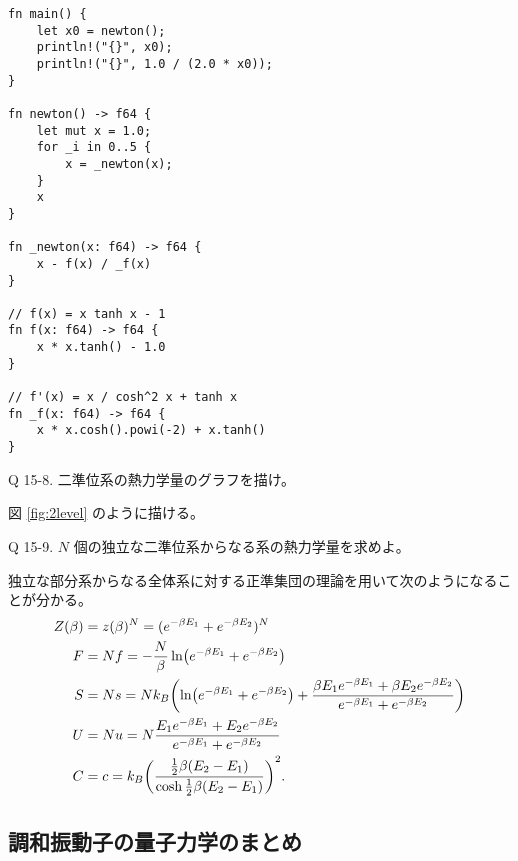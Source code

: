 \documentclass[uplatex,dvipdfmx,a4paper,11pt]{jlreq}
\theoremstyle{definition}
\begin{document}
\begin{lstlisting}[caption=Newton 法による,label=newton]
fn main() {
    let x0 = newton();
    println!("{}", x0);
    println!("{}", 1.0 / (2.0 * x0));
}

fn newton() -> f64 {
    let mut x = 1.0;
    for _i in 0..5 {
        x = _newton(x);
    }
    x
}

fn _newton(x: f64) -> f64 {
    x - f(x) / _f(x)
}

// f(x) = x tanh x - 1
fn f(x: f64) -> f64 {
    x * x.tanh() - 1.0
}

// f'(x) = x / cosh^2 x + tanh x
fn _f(x: f64) -> f64 {
    x * x.cosh().powi(-2) + x.tanh()
}
\end{lstlisting}

\begin{itembox}[l]{Q 15-8.}
  二準位系の熱力学量のグラフを描け。
\end{itembox}

図 \ref{fig:2level} のように描ける。



\begin{itembox}[l]{Q 15-9.}
  $N$ 個の独立な二準位系からなる系の熱力学量を求めよ。
\end{itembox}

独立な部分系からなる全体系に対する正準集団の理論を用いて次のようになることが分かる。
\begin{align}
  Z(\beta) & = z(\beta)^N = (e^{-\beta E_1} + e^{-\beta E_2})^N                                                                                                \\
  F        & = Nf = -\frac{N}{\beta}\ln(e^{-\beta E_1} + e^{-\beta E_2})                                                                                       \\
  S        & = Ns = Nk_B\qty(\ln(e^{-\beta E_1} + e^{-\beta E_2}) + \frac{\beta E_1e^{-\beta E_1} + \beta E_2e^{-\beta E_2}}{e^{-\beta E_1} + e^{-\beta E_2}}) \\
  U        & = Nu = N\frac{E_1e^{-\beta E_1} + E_2e^{-\beta E_2}}{e^{-\beta E_1} + e^{-\beta E_2}}                                                             \\
  C        & = c = k_B\qty(\frac{\frac{1}{2}\beta(E_2 - E_1)}{\cosh\frac{1}{2}\beta(E_2 - E_1)})^2.
\end{align}

\subsection{調和振動子の量子力学のまとめ}
\end{document}
